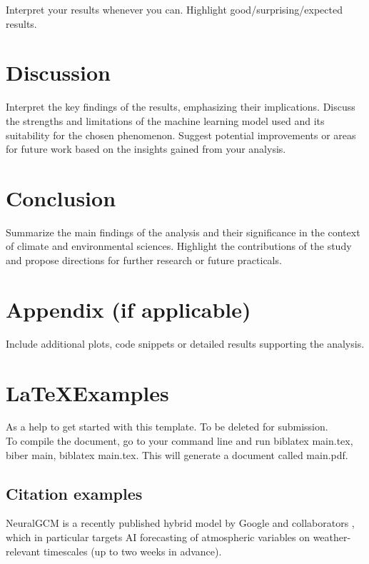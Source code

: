 Interpret your results whenever you can. Highlight good/surprising/expected results.

\newpage

\section{Discussion}
Interpret the key findings of the results, emphasizing their implications. Discuss the strengths and limitations of the machine learning model used and its suitability for the chosen phenomenon. Suggest potential improvements or areas for future work based on the insights gained from your analysis.

\newpage

\section{Conclusion}
Summarize the main findings of the analysis and their significance in the context of climate and environmental sciences. Highlight the contributions of the study and propose directions for further research or future practicals.

\newpage

\printbibliography
{}

\newpage

\section*{\LARGE Appendix (if applicable)}
Include additional plots, code snippets or detailed results supporting the analysis.


\newpage
\section*{\LaTeX Examples}
As a help to get started with this template. To be deleted for submission.\\
To compile the document, go to your command line and run biblatex main.tex, biber main, biblatex main.tex. This will generate a document called main.pdf.

\subsection*{Citation examples}

NeuralGCM is a recently published hybrid model by Google and collaborators \cite{kochkov2024neural}, which in particular targets AI forecasting of atmospheric variables on weather-relevant timescales (up to two weeks in advance).

